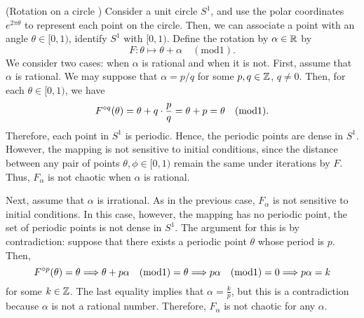 \documentclass[12pt,draft,twoside]{book}
\begin{document}
\begin{example}
  (Rotation on a circle \citep{devaney})
  Consider a unit circle $S^1$, and use the polar coordinates $e^{2\pi \theta}$ to represent each point on the circle.
  Then, we can associate a point with an angle $\theta \in [0, 1)$, identify $S^1$ with $[0,1)$. %
  Define the rotation by $\alpha \in \mathbb{R}$ by
  \begin{equation*}
    F: \theta \mapsto \theta + \alpha \quad(\mathrm{mod} 1).
  \end{equation*}
  We consider two cases: when $\alpha$ is rational and when it is not.
  First, assume that $\alpha$ is rational.
  We may suppose that $\alpha = p/q$ for some $p, q \in \mathbb{Z}$, $q \neq 0$.
  Then, for each $\theta \in [0, 1)$, we have %
  \begin{equation*}
    F^{\circ q}(\theta) = \theta + q \cdot \frac{p}{q} = \theta + p = \theta \quad(\mathrm{mod} 1).
  \end{equation*}
Therefore, each point in $S^1$ is periodic. %
  Hence, the periodic points are dense in $S^1$. %
  However, the mapping is not sensitive to initial conditions, since the distance between any pair of points $\theta, \phi \in [0,1)$ remain the same under iterations by $F$.  %
  Thus, $F_\alpha$ is not chaotic when $\alpha$ is rational.

  Next, assume that $\alpha$ is irrational.
  As in the previous case, $F_\alpha$ is not sensitive to initial conditions.
In this case, however, the mapping has no periodic point, the set of periodic points is not dense in $S^1$. %
The argument for this is by contradiction: suppose that there exists a periodic point $\theta$ whose period is $p$.
Then,
\begin{equation*}
  F^{\circ p}(\theta) = \theta 
  \Longrightarrow
  \theta + p\alpha \quad(\mathrm{mod} 1) = \theta
  \Longrightarrow
  p\alpha \quad(\mathrm{mod} 1) = 0
  \Longrightarrow
  p\alpha = k
\end{equation*}
for some $k \in \mathbb{Z}$.
The last equality implies that $\alpha = \frac{k}{p}$, but this is a contradiction because $\alpha$ is not a rational number.
Therefore, $F_\alpha$ is not chaotic for any $\alpha$.


\end{example}
\end{document}
